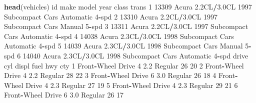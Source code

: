 \documentclass[
]{book}
\newenvironment{Shaded}{\begin{snugshade}}{\end{snugshade}}
\newcommand{\DecValTok}[1]{\textcolor[rgb]{0.00,0.00,0.81}{#1}}
\newcommand{\FloatTok}[1]{\textcolor[rgb]{0.00,0.00,0.81}{#1}}
\newcommand{\FunctionTok}[1]{\textcolor[rgb]{0.13,0.29,0.53}{\textbf{#1}}}
\newcommand{\NormalTok}[1]{#1}
\newcommand{\SpecialCharTok}[1]{\textcolor[rgb]{0.81,0.36,0.00}{\textbf{#1}}}
\begin{document}
\begin{Shaded}
\begin{Highlighting}[]
\FunctionTok{head}\NormalTok{(vehicles) }
\NormalTok{     id  make       model year           class           trans}
\DecValTok{1} \DecValTok{13309}\NormalTok{ Acura }\FloatTok{2.2}\NormalTok{CL}\SpecialCharTok{/}\FloatTok{3.0}\NormalTok{CL }\DecValTok{1997}\NormalTok{ Subcompact Cars Automatic }\DecValTok{4}\SpecialCharTok{{-}}\NormalTok{spd}
\DecValTok{2} \DecValTok{13310}\NormalTok{ Acura }\FloatTok{2.2}\NormalTok{CL}\SpecialCharTok{/}\FloatTok{3.0}\NormalTok{CL }\DecValTok{1997}\NormalTok{ Subcompact Cars    Manual }\DecValTok{5}\SpecialCharTok{{-}}\NormalTok{spd}
\DecValTok{3} \DecValTok{13311}\NormalTok{ Acura }\FloatTok{2.2}\NormalTok{CL}\SpecialCharTok{/}\FloatTok{3.0}\NormalTok{CL }\DecValTok{1997}\NormalTok{ Subcompact Cars Automatic }\DecValTok{4}\SpecialCharTok{{-}}\NormalTok{spd}
\DecValTok{4} \DecValTok{14038}\NormalTok{ Acura }\FloatTok{2.3}\NormalTok{CL}\SpecialCharTok{/}\FloatTok{3.0}\NormalTok{CL }\DecValTok{1998}\NormalTok{ Subcompact Cars Automatic }\DecValTok{4}\SpecialCharTok{{-}}\NormalTok{spd}
\DecValTok{5} \DecValTok{14039}\NormalTok{ Acura }\FloatTok{2.3}\NormalTok{CL}\SpecialCharTok{/}\FloatTok{3.0}\NormalTok{CL }\DecValTok{1998}\NormalTok{ Subcompact Cars    Manual }\DecValTok{5}\SpecialCharTok{{-}}\NormalTok{spd}
\DecValTok{6} \DecValTok{14040}\NormalTok{ Acura }\FloatTok{2.3}\NormalTok{CL}\SpecialCharTok{/}\FloatTok{3.0}\NormalTok{CL }\DecValTok{1998}\NormalTok{ Subcompact Cars Automatic }\DecValTok{4}\SpecialCharTok{{-}}\NormalTok{spd}
\NormalTok{              drive cyl displ    fuel hwy cty}
\DecValTok{1}\NormalTok{ Front}\SpecialCharTok{{-}}\NormalTok{Wheel Drive   }\DecValTok{4}   \FloatTok{2.2}\NormalTok{ Regular  }\DecValTok{26}  \DecValTok{20}
\DecValTok{2}\NormalTok{ Front}\SpecialCharTok{{-}}\NormalTok{Wheel Drive   }\DecValTok{4}   \FloatTok{2.2}\NormalTok{ Regular  }\DecValTok{28}  \DecValTok{22}
\DecValTok{3}\NormalTok{ Front}\SpecialCharTok{{-}}\NormalTok{Wheel Drive   }\DecValTok{6}   \FloatTok{3.0}\NormalTok{ Regular  }\DecValTok{26}  \DecValTok{18}
\DecValTok{4}\NormalTok{ Front}\SpecialCharTok{{-}}\NormalTok{Wheel Drive   }\DecValTok{4}   \FloatTok{2.3}\NormalTok{ Regular  }\DecValTok{27}  \DecValTok{19}
\DecValTok{5}\NormalTok{ Front}\SpecialCharTok{{-}}\NormalTok{Wheel Drive   }\DecValTok{4}   \FloatTok{2.3}\NormalTok{ Regular  }\DecValTok{29}  \DecValTok{21}
\DecValTok{6}\NormalTok{ Front}\SpecialCharTok{{-}}\NormalTok{Wheel Drive   }\DecValTok{6}   \FloatTok{3.0}\NormalTok{ Regular  }\DecValTok{26}  \DecValTok{17}


\end{Highlighting}
\end{Shaded}
\end{document}

